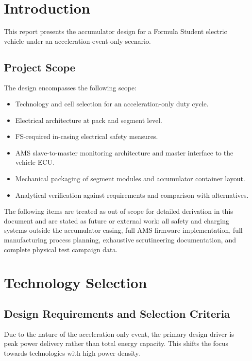 
\section{Introduction}
This report presents the accumulator design for a Formula Student electric vehicle under an acceleration-event-only scenario.


\subsection{Project Scope}
The design encompasses the following scope:
\begin{itemize}
    \item Technology and cell selection for an acceleration-only duty cycle.
    \item Electrical architecture at pack and segment level.
    \item FS-required in-casing electrical safety measures.
    \item AMS slave-to-master monitoring architecture and master interface to the vehicle ECU.
    \item Mechanical packaging of segment modules and accumulator container layout.
    \item Analytical verification against requirements and comparison with alternatives.
\end{itemize}

The following items are treated as out of scope for detailed derivation in this document and are stated as future or external work: all safety and charging systems outside the accumulator casing, full AMS firmware implementation, full manufacturing process planning, exhaustive scrutineering documentation, and complete physical test campaign data.

\section{Technology Selection}

\subsection{Design Requirements and Selection Criteria}
Due to the nature of the acceleration-only event, the primary design driver is peak power delivery rather than total energy capacity. This shifts the focus towards technologies with high power density.

